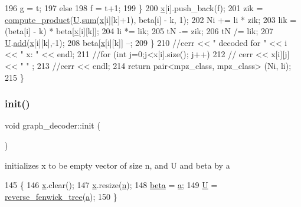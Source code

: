 \begin{DoxyCode}
196         g = t;
197       \textcolor{keywordflow}{else}
198         f = t+1;
199     \}
200     \hyperlink{classgraph__decoder_aa3f2776afe387668cf7f68109428e14e}{x}[i].push\_back(f);
201     zik = \hyperlink{compression__helper_8cpp_ae2afb43aabe50f7d42aae8f82b5a35f4}{compute\_product}(\hyperlink{classgraph__decoder_a2fa9fec2cef06aaa410e57fb59d5c1ad}{U}.\hyperlink{classreverse__fenwick__tree_a672731fd6395b4853430073a099a80e6}{sum}(\hyperlink{classgraph__decoder_aa3f2776afe387668cf7f68109428e14e}{x}[i][k]+1), beta[i] - k, 1);
202     Ni += li * zik;
203     lik = (beta[i] - k) * beta[\hyperlink{classgraph__decoder_aa3f2776afe387668cf7f68109428e14e}{x}[i][k]];
204     li *= lik;
205     tN -= zik;
206     tN /= lik;
207     \hyperlink{classgraph__decoder_a2fa9fec2cef06aaa410e57fb59d5c1ad}{U}.\hyperlink{classreverse__fenwick__tree_a942d7f49b37e53ebfec3076d177691d7}{add}(\hyperlink{classgraph__decoder_aa3f2776afe387668cf7f68109428e14e}{x}[i][k],-1);
208     beta[\hyperlink{classgraph__decoder_aa3f2776afe387668cf7f68109428e14e}{x}[i][k]] --;
209   \}
210   \textcolor{comment}{//cerr << " decoded for " << i << " x: " << endl;}
211   \textcolor{comment}{//for (int j=0;j<x[i].size(); j++)}
212   \textcolor{comment}{//  cerr << x[i][j] << " " ;}
213   \textcolor{comment}{//cerr << endl;}
214   \textcolor{keywordflow}{return} pair<mpz\_class, mpz\_class> (Ni, li);
215 \}
\end{DoxyCode}
\mbox{\label{classgraph__decoder_a97a9dcd5af21ece86fa91adcb41ca9cc}} 
\subsubsection{\texorpdfstring{init()}{init()}}
{\footnotesize\ttfamily void graph\+\_\+decoder\+::init (\begin{DoxyParamCaption}{ }\end{DoxyParamCaption})}



initializes x to be empty vector of size n, and U and beta by a 


\begin{DoxyCode}
145 \{
146   \hyperlink{classgraph__decoder_aa3f2776afe387668cf7f68109428e14e}{x}.clear();
147   \hyperlink{classgraph__decoder_aa3f2776afe387668cf7f68109428e14e}{x}.resize(\hyperlink{classgraph__decoder_a6bc1e72b2f7a913d14b789a6c2d92c1e}{n});
148   \hyperlink{classgraph__decoder_aa57c11e4c09c52101682ff83286162f7}{beta} = \hyperlink{classgraph__decoder_a9dd7c3c11b8a45a12cb7c3c2d2bfa2cc}{a};
149   \hyperlink{classgraph__decoder_a2fa9fec2cef06aaa410e57fb59d5c1ad}{U} = \hyperlink{classreverse__fenwick__tree}{reverse\_fenwick\_tree}(\hyperlink{classgraph__decoder_a9dd7c3c11b8a45a12cb7c3c2d2bfa2cc}{a});
150 \}
\end{DoxyCode}


